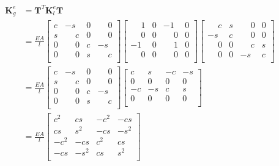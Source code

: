 \documentclass[10pt,b5paper,titlepage]{book}
\newcommand{\m}{\mathbf}
\newenvironment{eqarray}
{
    \begin{eqnarray}
        \begin{aligned}
}
{
        \end{aligned}
    \end{eqnarray}
}
\begin{document}
\begin{eqarray}
    \m{K}_g^e &= \m{T}^T \m{K}_l^e \m{T} \\
    &= \frac{EA}{l}
    \begin{bmatrix}
        c & -s & 0 & \phantom{-}0 \\
        s & \phantom{-}c & 0 & \phantom{-}0 \\
        0 & \phantom{-}0 & c & -s \\
        0 & \phantom{-}0 & s & \phantom{-}c \\
    \end{bmatrix}
    \begin{bmatrix}
        \phantom{-}1 & 0 & -1 & 0 \\
        \phantom{-}0 & 0 & \phantom{-}0 & 0 \\
        -1 & 0 & \phantom{-}1 & 0 \\
        \phantom{-}0 & 0 & \phantom{-}0 & 0 \\
    \end{bmatrix}
    \begin{bmatrix}
        \phantom{-}c & s & \phantom{-}0 & 0 \\
        -s & c & \phantom{-}0 & 0 \\
        \phantom{-}0 & 0 & \phantom{-}c & s \\
        \phantom{-}0 & 0 & -s & c \\
    \end{bmatrix} \\
    &= \frac{EA}{l}
    \begin{bmatrix}
        c & -s & 0 & \phantom{-}0 \\
        s & \phantom{-}c & 0 & \phantom{-}0 \\
        0 & \phantom{-}0 & c & -s \\
        0 & \phantom{-}0 & s & \phantom{-}c \\
    \end{bmatrix}
    \begin{bmatrix}
        c & s & -c & -s \\
        0 & 0 & 0 & 0 \\
        -c & -s & c & s \\
        0 & 0 & 0 & 0 \\
    \end{bmatrix} \\
    &= \frac{EA}{l}
    \begin{bmatrix}
        c^2 & cs & -c^2 & -cs \\
        cs & s^2 & -cs & -s^2 \\
        -c^2 & -cs & c^2 & cs \\
        -cs & -s^2 & cs & s^2 \\
    \end{bmatrix}
\end{eqarray}
\end{document}
